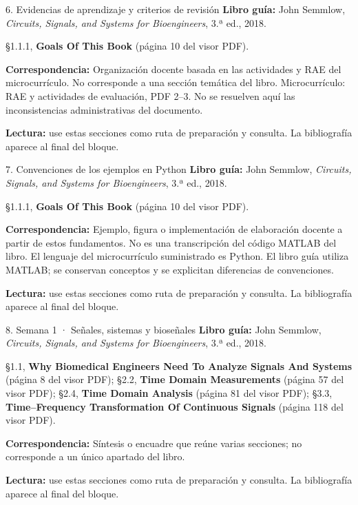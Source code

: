 \documentclass[
  10pt,
  ignorenonframetext,
  aspectratio=169,
  spanish,
]{beamer}
\begin{document}
\begin{frame}{6. Evidencias de aprendizaje y criterios de revisión}
\label{evidencias-de-aprendizaje-y-criterios-de-revisiuxf3n}
\textbf{Libro guía:} John Semmlow, \emph{Circuits, Signals, and Systems
for Bioengineers}, 3.ª ed., 2018.

§1.1.1, \textbf{Goals Of This Book} (página 10 del visor PDF).

\textbf{Correspondencia:} Organización docente basada en las actividades
y RAE del microcurrículo. No corresponde a una sección temática del
libro. Microcurrículo: RAE y actividades de evaluación, PDF 2--3. No se
resuelven aquí las inconsistencias administrativas del documento.

\textbf{Lectura:} use estas secciones como ruta de preparación y
consulta. La bibliografía aparece al final del bloque.
\end{frame}

\begin{frame}{7. Convenciones de los ejemplos en Python}
\label{convenciones-de-los-ejemplos-en-python}
\textbf{Libro guía:} John Semmlow, \emph{Circuits, Signals, and Systems
for Bioengineers}, 3.ª ed., 2018.

§1.1.1, \textbf{Goals Of This Book} (página 10 del visor PDF).

\textbf{Correspondencia:} Ejemplo, figura o implementación de
elaboración docente a partir de estos fundamentos. No es una
transcripción del código MATLAB del libro. El lenguaje del
microcurrículo suministrado es Python. El libro guía utiliza MATLAB; se
conservan conceptos y se explicitan diferencias de convenciones.

\textbf{Lectura:} use estas secciones como ruta de preparación y
consulta. La bibliografía aparece al final del bloque.
\end{frame}

\begin{frame}{8. Semana 1 · Señales, sistemas y bioseñales}
\label{semana-1-seuxf1ales-sistemas-y-bioseuxf1ales}
\textbf{Libro guía:} John Semmlow, \emph{Circuits, Signals, and Systems
for Bioengineers}, 3.ª ed., 2018.

§1.1, \textbf{Why Biomedical Engineers Need To Analyze Signals And
Systems} (página 8 del visor PDF); §2.2, \textbf{Time Domain
Measurements} (página 57 del visor PDF); §2.4, \textbf{Time Domain
Analysis} (página 81 del visor PDF); §3.3, \textbf{Time--Frequency
Transformation Of Continuous Signals} (página 118 del visor PDF).

\textbf{Correspondencia:} Síntesis o encuadre que reúne varias
secciones; no corresponde a un único apartado del libro.

\textbf{Lectura:} use estas secciones como ruta de preparación y
consulta. La bibliografía aparece al final del bloque.
\end{frame}
\end{document}
